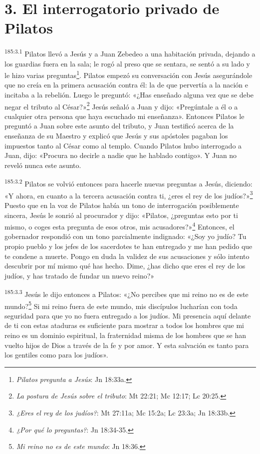 \section*{3. El interrogatorio privado de Pilatos}
\par
\textsuperscript{185:3.1} Pilatos llevó a Jesús y a Juan Zebedeo a una habitación privada, dejando a los guardias fuera en la sala; le rogó al preso que se sentara, se sentó a su lado y le hizo varias preguntas\footnote{\textit{Pilatos pregunta a Jesús}: Jn 18:33a.}. Pilatos empezó su conversación con Jesús asegurándole que no creía en la primera acusación contra él: la de que pervertía a la nación e incitaba a la rebelión. Luego le preguntó: «¿Has enseñado alguna vez que se debe negar el tributo al César?»\footnote{\textit{La postura de Jesús sobre el tributo}: Mt 22:21; Mc 12:17; Lc 20:25.} Jesús señaló a Juan y dijo: «Pregúntale a él o a cualquier otra persona que haya escuchado mi enseñanza». Entonces Pilatos le preguntó a Juan sobre este asunto del tributo, y Juan testificó acerca de la enseñanza de su Maestro y explicó que Jesús y sus apóstoles pagaban los impuestos tanto al César como al templo. Cuando Pilatos hubo interrogado a Juan, dijo: «Procura no decirle a nadie que he hablado contigo». Y Juan no reveló nunca este asunto.

\par
\textsuperscript{185:3.2} Pilatos se volvió entonces para hacerle nuevas preguntas a Jesús, diciendo: «Y ahora, en cuanto a la tercera acusación contra ti, ¿eres el rey de los judíos?»\footnote{\textit{¿Eres el rey de los judíos?}: Mt 27:11a; Mc 15:2a; Lc 23:3a; Jn 18:33b.} Puesto que en la voz de Pilatos había un tono de interrogación posiblemente sincera, Jesús le sonrió al procurador y dijo: «Pilatos, ¿preguntas esto por ti mismo, o coges esta pregunta de esos otros, mis acusadores?»\footnote{\textit{¿Por qué lo preguntas?}: Jn 18:34-35.} Entonces, el gobernador respondió con un tono parcialmente indignado: «¿Soy yo judío? Tu propio pueblo y los jefes de los sacerdotes te han entregado y me han pedido que te condene a muerte. Pongo en duda la validez de sus acusaciones y sólo intento descubrir por mí mismo qué has hecho. Dime, ¿has dicho que eres el rey de los judíos, y has tratado de fundar un nuevo reino?»

\par
\textsuperscript{185:3.3} Jesús le dijo entonces a Pilatos: «¿No percibes que mi reino no es de este mundo?\footnote{\textit{Mi reino no es de este mundo}: Jn 18:36.} Si mi reino fuera de este mundo, mis discípulos lucharían con toda seguridad para que yo no fuera entregado a los judíos. Mi presencia aquí delante de ti con estas ataduras es suficiente para mostrar a todos los hombres que mi reino es un dominio espiritual, la fraternidad misma de los hombres que se han vuelto hijos de Dios a través de la fe y por amor. Y esta salvación es tanto para los gentiles como para los judíos».


